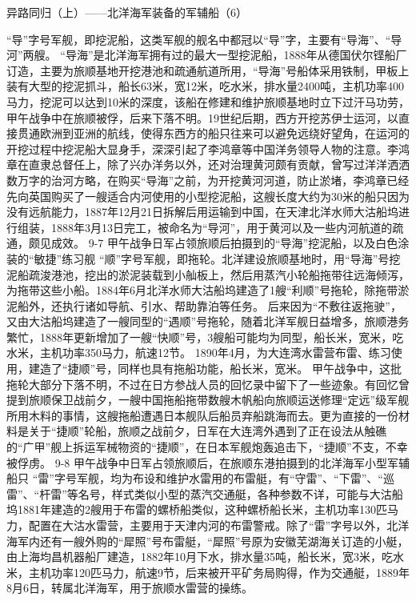 \documentclass[12pt,UTF8]{ctexbook}
\begin{document}
异路同归（上）——北洋海军装备的军辅船（6）

“导”字号军舰，即挖泥船，这类军舰的舰名中都冠以“导”字，主要有“导海”、“导河”两艘。 “导海”是北洋海军拥有过的最大一型挖泥船，1888年从德国伏尔铿船厂订造，主要为旅顺基地开挖港池和疏通航道所用，“导海”号船体采用铁制，甲板上装有大型的挖泥抓斗，船长63米，宽12米，吃水米，排水量2400吨，主机功率400马力，挖泥可以达到10米的深度，该船在修建和维护旅顺基地时立下过汗马功劳，甲午战争中在旅顺被俘，后来下落不明。19世纪后期，西方开挖苏伊士运河，以直接贯通欧洲到亚洲的航线，使得东西方的船只往来可以避免远绕好望角，在运河的开挖过程中挖泥船大显身手，深深引起了李鸿章等中国洋务领导人物的注意。李鸿章在直隶总督任上，除了兴办洋务以外，还对治理黄河颇有贡献，曾写过洋洋洒洒数万字的治河方略，在购买“导海”之前，为开挖黄河河道，防止淤堵，李鸿章已经先向英国购买了一艘适合内河使用的小型挖泥船，这艘长度大约为30米的船只因为没有远航能力，1887年12月21日拆解后用运输到中国，在天津北洋水师大沽船坞进行组装，1888年3月13日完工，被命名为“导河”，用于黄河以及一些内河航道的疏通，颇见成效。
9-7
甲午战争日军占领旅顺后拍摄到的“导海”挖泥船，以及白色涂装的“敏捷”练习舰
“顺”字号军舰，即拖轮。北洋建设旅顺基地时，用“导海”号挖泥船疏浚港池，挖出的淤泥装载到小舢板上，然后用蒸汽小轮船拖带往远海倾泻，为拖带这些小船。1884年6月北洋水师大沽船坞建造了1艘“利顺”号拖轮，除拖带淤泥船外，还执行诸如导航、引水、帮助靠泊等任务。 后来因为“不敷往返拖驶”，又由大沽船坞建造了一艘同型的“遇顺”号拖轮，随着北洋军舰日益增多，旅顺港务繁忙，1888年更新增加了一艘“快顺”号，3艘船可能均为同型，船长米，宽米，吃水米，主机功率350马力，航速12节。 1890年4月，为大连湾水雷营布雷、练习使用，建造了“捷顺”号，同样也具有拖船功能，船长米，宽米。 甲午战争中，这批拖轮大部分下落不明，不过在日方参战人员的回忆录中留下了一些迹象。有回忆曾提到旅顺保卫战前夕，一艘中国拖船拖带数艘木帆船向旅顺运送修理“定远”级军舰所用木料的事情，这艘拖船遭遇日本舰队后船员弃船跳海而去。更为直接的一份材料是关于“捷顺”轮船，旅顺之战前夕，日军在大连湾外遇到了正在设法从触礁的“广甲”舰上拆运军械物资的“捷顺”，在日本军舰炮轰追击下，“捷顺”不支，不幸被俘虏。
9-8
甲午战争中日军占领旅顺后，在旅顺东港拍摄到的北洋海军小型军辅船只
“雷”字号军舰，均为布设和维护水雷用的布雷艇，有“守雷”、“下雷”、“巡雷”、“杆雷”等名号，样式类似小型的蒸汽交通艇，各种参数不详，可能与大沽船坞1881年建造的2艘用于布雷的螺桥船类似，这种螺桥船长米，主机功率130匹马力，配置在大沽水雷营，主要用于天津内河的布雷警戒。除了“雷”字号以外，北洋海军内还有一艘外购的“犀照”号布雷艇，“犀照”号原为安徽芜湖海关订造的小艇，由上海均昌机器船厂建造，1882年10月下水，排水量35吨，船长米，宽3米，吃水米，主机功率120匹马力，航速9节，后来被开平矿务局购得，作为交通艇，1889年8月6日，转属北洋海军，用于旅顺水雷营的操练。
\end{document}

